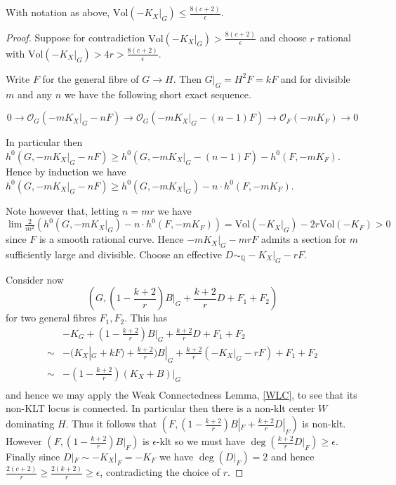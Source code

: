 \documentclass[a4paper,12pt]{book}
\newcommand{\Vol}{\text{Vol}}
\begin{document}
\begin{lemma}\cite[Lemma 6.5]{jiang2014boundedness}
	With notation as above, $\Vol(-K_{X}|_{G}) \leq \frac{8(c+2)}{\epsilon}$. 
\end{lemma}
\begin{proof}
	Suppose for contradiction $\Vol(-K_{X}|_{G}) >\frac{8(c+2)}{\epsilon}$ and choose $r$ rational with $\Vol(-K_{X}|_{G}) > 4r >\frac{8(c+2)}{\epsilon}$.
	
	Write $F$ for the general fibre of $G \to H$. Then $G|_{G}=H^{2}F=kF$ and for divisible $m$ and any $n$ we have the following short exact sequence.
	
	\[0 \to \mathcal{O}_{G}(-mK_{X}|_{G}-nF) \to \mathcal{O}_{G}(-mK_{X}|_{G}-(n-1)F) \to \mathcal{O}_{F}(-mK_{F}) \to 0\]
	
	In particular then $h^{0}(G,-mK_{X}|_{G}-nF) \geq h^{0}(G,-mK_{X}|_{G}-(n-1)F)-h^{0}(F,-mK_{F})$.
	Hence by induction we have $h^{0}(G,-mK_{X}|_{G}-nF) \geq h^{0}(G,-mK_{X}|_{G})-n\cdot h^{0}(F,-mK_{F})$.
	
	Note however that, letting $n=mr$ we have $\lim \frac{2}{m^{2}}(h^{0}(G,-mK_{X}|_{G})-n\cdot h^{0}(F,-mK_{F}))= \Vol(-K_{X}|_{G})-2r\Vol(-K_{F}) > 0$ since $F$ is a smooth rational curve. Hence $-mK_{X}|_{G}-mrF$ admits a section for $m$ sufficiently large and divisible. Choose an effective $D\sim_{\mathbb{Q}} -K_{X}|_{G}-rF$.
	
	Consider now \[(G,(1-\frac{k+2}{r})B|_{G}+\frac{k+2}{r}D+F_{1}+F_{2})\]
	 for two general fibres $F_{1}, F_{2}$.
	This has \begin{align*}
	&-K_{G}+(1-\frac{k+2}{r})B|_{G}+\frac{k+2}{r}D+F_{1}+F_{2}	\\
	\sim & -(K_{X}|_{G}+kF)+\frac{k+2}{r})B|_{G}+\frac{k+2}{r}(-K_{X}|_{G}-rF)+F_{1}+F_{2} \\	
	\sim & -(1-\frac{k+2}{r})(K_{X}+B)|_{G} \\
	\end{align*}
	and hence we may apply the Weak Connectedness Lemma, \autoref{WLC}, to see that its non-KLT locus is connected. In particular then there is a non-klt center $W$ dominating $H$. Thus it follows that $(F,(1-\frac{k+2}{r})B|_{F}+\frac{k+2}{r}D|_{F})$ is non-klt. However $(F,(1-\frac{k+2}{r})B|_{F})$ is $\epsilon$-klt so we must have $\deg (\frac{k+2}{r}D|_{F})\geq \epsilon$. Finally since $D|_{F}\sim -K_{X}|_{F}=-K_{F}$ we have $\deg(D|_{F})=2$ and hence $\frac{2(c+2)}{r} \geq \frac{2(k+2)}{r} \geq \epsilon$, contradicting the choice of $r$.
\end{proof}
\end{document}
